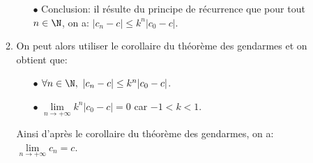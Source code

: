 \documentclass[a4paper, 11pt,reqno]{article}
\begin{document}
\begin{correction}
\begin{enumerate}
\begin{enumerate}
\begin{itemize}
\item[$\bullet$] Conclusion: il r\'esulte du principe de r\'ecurrence que pour tout $n\in\N$, on a: $|c_n-c|\leq k^n |c_0-c|$.
\end{itemize}
\item On peut alors utiliser le corollaire du th\'eor\`{e}me des gendarmes et on obtient que:
\begin{itemize}
\item[$\bullet$] $\forall n\in\N,\ |c_n-c|\leq k^n |c_0-c|$.
\item[$\bullet$] $\lim\limits_{n\to +\infty} k^n|c_0-c|=0$ car $-1<k<1$.
\end{itemize}
Ainsi d'apr\`{e}s le corollaire du th\'eor\`{e}me des gendarmes, on a: $\lim\limits_{n\to +\infty} c_n=c$.
\end{enumerate}
\end{enumerate}
\end{correction}
\end{document}
